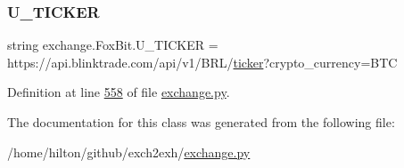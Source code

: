 \subsubsection{\texorpdfstring{U\+\_\+\+T\+I\+C\+K\+ER}{U\_TICKER}}
{\footnotesize\ttfamily string exchange.\+Fox\+Bit.\+U\+\_\+\+T\+I\+C\+K\+ER = \textquotesingle{}https\+://api.\+blinktrade.\+com/api/v1/B\+RL/\hyperlink{classexchange_1_1_exchange_a7cf9e52f993627955a2e242c388daaeb}{ticker}?crypto\+\_\+currency=B\+TC\textquotesingle{}\hspace{0.3cm}{\ttfamily [static]}}



Definition at line \hyperlink{exchange_8py_source_l00558}{558} of file \hyperlink{exchange_8py_source}{exchange.\+py}.



The documentation for this class was generated from the following file\+:\begin{DoxyCompactItemize}
\item 
/home/hilton/github/exch2exh/\hyperlink{exchange_8py}{exchange.\+py}\end{DoxyCompactItemize}
